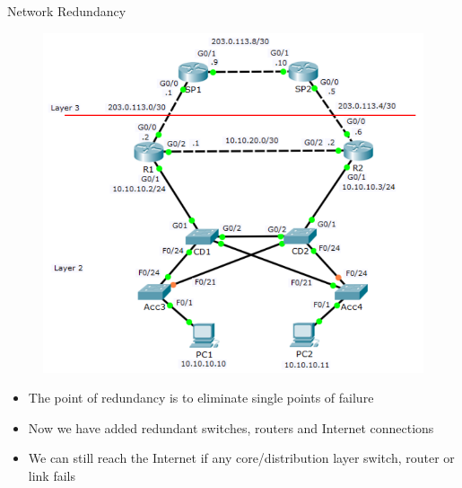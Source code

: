 \documentclass[pdflatex,compress,mathserif]{beamer}
\begin{document}
\begin{frame}{Network Redundancy}
	\begin{multicols}{2}
		\begin{figure}
			\centering
			\includegraphics[width=\linewidth]{img/img02}
		\end{figure}
		\columnbreak
		\begin{itemize}
			\item The point of redundancy is to
eliminate single points of failure
			\item Now we have added redundant
switches, routers and Internet
connections
			\item We can still reach the Internet if any
core/distribution layer switch, router
or link fails
		\end{itemize}
	\end{multicols}
\end{frame}
\end{document}
